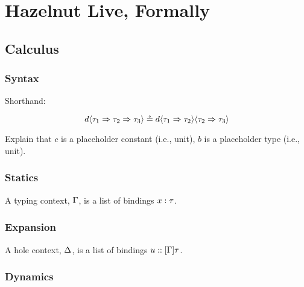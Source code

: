 
\clearpage
\newcommand{\calculusSec}{Hazelnut Live, Formally}
\section{\protect\calculusSec}
\label{sec:calculus}

\subsection{Calculus}

\subsubsection{Syntax}



{\color{gray}\blindtext}

Shorthand:

$$
d \langle{\tau_1}\Rightarrow{\tau_2}\Rightarrow{\tau_3}\rangle \circeq
  d \langle{\tau_1}\Rightarrow{\tau_2}\rangle \langle{\tau_2}\Rightarrow{\tau_3}\rangle
$$

Explain that $c$ is a placeholder constant (i.e., unit), $b$ is a placeholder
type (i.e., unit).



\subsubsection{Statics}




{\color{gray}\blindtext}
{\color{gray}\blindtext}
{\color{gray}\blindtext}

A typing context, $\Gamma$, is a list of bindings $x : \tau$.

\subsubsection{Expansion}




{\color{gray}\blindtext}
{\color{gray}\blindtext}
{\color{gray}\blindtext}

A hole context, $\Delta$, is a list of bindings $u :: [\Gamma]\tau$.

\subsubsection{Dynamics}

